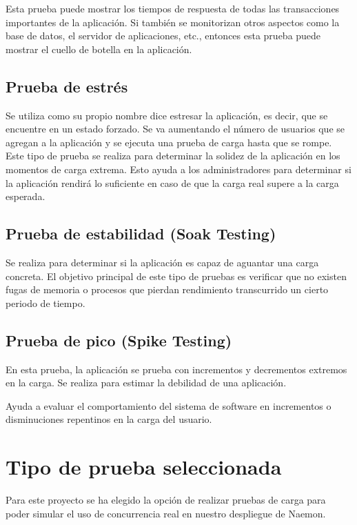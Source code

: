 Esta prueba puede mostrar los tiempos de respuesta de todas las transacciones importantes de la aplicación. Si también se monitorizan otros aspectos como la base de datos, el servidor de aplicaciones, etc., entonces esta prueba puede mostrar el cuello de botella en la aplicación.\cite{pruebas}

\subsection{Prueba de estrés}

Se utiliza como su propio nombre dice estresar la aplicación, es decir, que se encuentre en un estado forzado. Se va aumentando el número de usuarios que se agregan a la aplicación y se ejecuta una prueba de carga hasta que se rompe. Este tipo de prueba se realiza para determinar la solidez de la aplicación en los momentos de carga extrema. Esto ayuda a los administradores para determinar si la aplicación rendirá lo suficiente en caso de que la carga real supere a la carga esperada.\cite{pruebas}

\subsection{Prueba de estabilidad (Soak Testing)}

Se realiza para determinar si la aplicación es capaz de aguantar una carga concreta. El objetivo principal de este tipo de pruebas es verificar que no existen fugas de memoria o procesos que pierdan rendimiento transcurrido un cierto periodo de tiempo.\cite{pruebas}
\newpage
\subsection{Prueba de pico (Spike Testing)}

En esta prueba, la aplicación se prueba con incrementos y decrementos extremos en la carga. Se realiza para estimar la debilidad de una aplicación.

Ayuda a evaluar el comportamiento del sistema de software en incrementos o disminuciones repentinos en la carga del usuario.\cite{pruebas}


\section{Tipo de prueba seleccionada}
Para este proyecto se ha elegido la opción de realizar pruebas de carga para poder simular el uso de concurrencia real en nuestro despliegue de Naemon.

